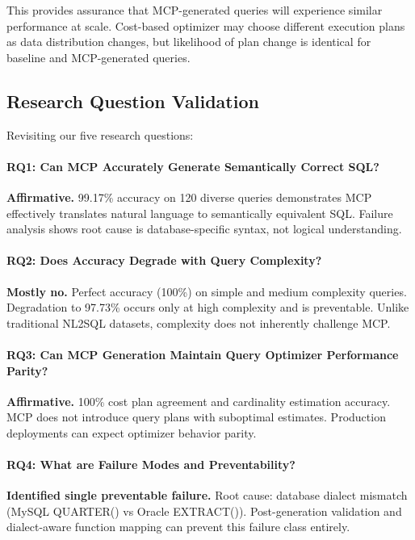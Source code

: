 This provides assurance that MCP-generated queries will experience similar performance at scale. Cost-based optimizer may choose different execution plans as data distribution changes, but likelihood of plan change is identical for baseline and MCP-generated queries.

\subsection{Research Question Validation}

Revisiting our five research questions:

\paragraph{RQ1: Can MCP Accurately Generate Semantically Correct SQL?}
\textbf{Affirmative.} 99.17\% accuracy on 120 diverse queries demonstrates MCP effectively translates natural language to semantically equivalent SQL. Failure analysis shows root cause is database-specific syntax, not logical understanding.

\paragraph{RQ2: Does Accuracy Degrade with Query Complexity?}
\textbf{Mostly no.} Perfect accuracy (100\%) on simple and medium complexity queries. Degradation to 97.73\% occurs only at high complexity and is preventable. Unlike traditional NL2SQL datasets, complexity does not inherently challenge MCP.

\paragraph{RQ3: Can MCP Generation Maintain Query Optimizer Performance Parity?}
\textbf{Affirmative.} 100\% cost plan agreement and cardinality estimation accuracy. MCP does not introduce query plans with suboptimal estimates. Production deployments can expect optimizer behavior parity.

\paragraph{RQ4: What are Failure Modes and Preventability?}
\textbf{Identified single preventable failure.} Root cause: database dialect mismatch (MySQL QUARTER() vs Oracle EXTRACT()). Post-generation validation and dialect-aware function mapping can prevent this failure class entirely.

